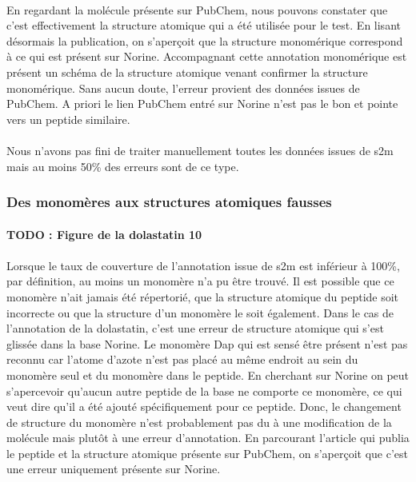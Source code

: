 \documentclass[12pt,french,twoside]{report}
\begin{document}
\paragraph{}En regardant la molécule présente sur PubChem, nous pouvons constater que c'est effectivement la structure atomique qui a été utilisée pour le test.
En lisant désormais la publication, on s'aperçoit que la structure monomérique correspond à ce qui est présent sur Norine.
Accompagnant cette annotation monomérique est présent un schéma de la structure atomique venant confirmer la structure monomérique.
Sans aucun doute, l'erreur provient des données issues de PubChem.
A priori le lien PubChem entré sur Norine n'est pas le bon et pointe vers un peptide similaire.

\paragraph{}Nous n'avons pas fini de traiter manuellement toutes les données issues de s2m mais au moins 50\% des erreurs sont de ce type.


\subsubsection{Des monomères aux structures atomiques fausses}

\label{dolastatin_p}

\paragraph{TODO : Figure de la dolastatin 10}

\paragraph{}Lorsque le taux de couverture de l'annotation issue de s2m est inférieur à 100\%, par définition, au moins un monomère n'a pu être trouvé.
Il est possible que ce monomère n'ait jamais été répertorié, que la structure atomique du peptide soit incorrecte ou que la structure d'un monomère le soit également.
Dans le cas de l'annotation de la dolastatin, c'est une erreur de structure atomique qui s'est glissée dans la base Norine.
Le monomère Dap qui est sensé être présent n'est pas reconnu car l'atome d'azote n'est pas placé au même endroit au sein du monomère seul et du monomère dans le peptide.
En cherchant sur Norine on peut s'apercevoir qu'aucun autre peptide de la base ne comporte ce monomère, ce qui veut dire qu'il a été ajouté spécifiquement pour ce peptide.
Donc, le changement de structure du monomère n'est probablement pas du à une modification de la molécule mais plutôt à une erreur d'annotation.
En parcourant l'article qui publia le peptide et la structure atomique présente sur PubChem, on s'aperçoit que c'est une erreur uniquement présente sur Norine.
\end{document}
